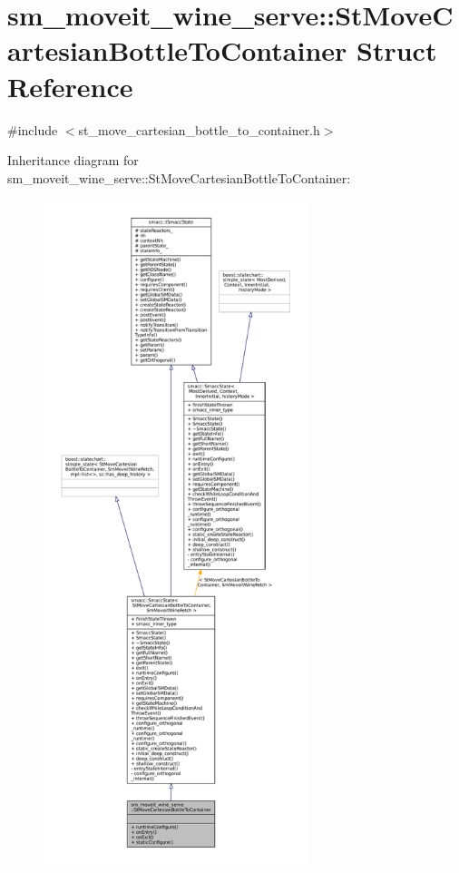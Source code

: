 \hypertarget{structsm__moveit__wine__serve_1_1StMoveCartesianBottleToContainer}{}\section{sm\+\_\+moveit\+\_\+wine\+\_\+serve\+:\+:St\+Move\+Cartesian\+Bottle\+To\+Container Struct Reference}
\label{structsm__moveit__wine__serve_1_1StMoveCartesianBottleToContainer}


{\ttfamily \#include $<$st\+\_\+move\+\_\+cartesian\+\_\+bottle\+\_\+to\+\_\+container.\+h$>$}



Inheritance diagram for sm\+\_\+moveit\+\_\+wine\+\_\+serve\+:\+:St\+Move\+Cartesian\+Bottle\+To\+Container\+:
\nopagebreak
\begin{figure}[H]
\begin{center}
\leavevmode
\includegraphics[height=550pt]{structsm__moveit__wine__serve_1_1StMoveCartesianBottleToContainer__inherit__graph}
\end{center}
\end{figure}


